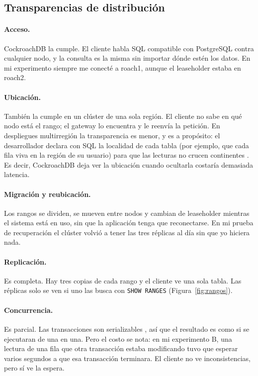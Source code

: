 \documentclass[12pt,a4paper]{article}
\begin{document}
\subsection{Transparencias de distribución}

\paragraph{Acceso.} CockroachDB la cumple. El cliente habla SQL compatible con PostgreSQL contra cualquier nodo, y la consulta es la misma sin importar dónde estén los datos. En mi experimento siempre me conecté a roach1, aunque el leaseholder estaba en roach2.

\paragraph{Ubicación.} También la cumple en un clúster de una sola región. El cliente no sabe en qué nodo está el rango; el gateway lo encuentra y le reenvía la petición. En despliegues multirregión la transparencia es menor, y es a propósito: el desarrollador declara con SQL la localidad de cada tabla (por ejemplo, que cada fila viva en la región de su usuario) para que las lecturas no crucen continentes \cite{vanbenschoten2022multiregion, ajmani2022demo}. Es decir, CockroachDB deja ver la ubicación cuando ocultarla costaría demasiada latencia.

\paragraph{Migración y reubicación.} Los rangos se dividen, se mueven entre nodos y cambian de leaseholder mientras el sistema está en uso, sin que la aplicación tenga que reconectarse. En mi prueba de recuperación el clúster volvió a tener las tres réplicas al día sin que yo hiciera nada.

\paragraph{Replicación.} Es completa. Hay tres copias de cada rango y el cliente ve una sola tabla. Las réplicas solo se ven si uno las busca con \texttt{SHOW RANGES} (Figura~\ref{fig:rangos}).

\paragraph{Concurrencia.} Es parcial. Las transacciones son serializables \cite{ajmani2022demo}, así que el resultado es como si se ejecutaran de una en una. Pero el costo se nota: en mi experimento B, una lectura de una fila que otra transacción estaba modificando tuvo que esperar varios segundos a que esa transacción terminara. El cliente no ve inconsistencias, pero sí ve la espera.
\end{document}
